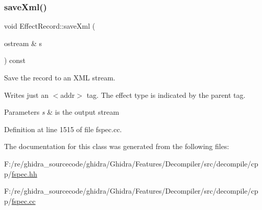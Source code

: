 \subsubsection{\texorpdfstring{saveXml()}{saveXml()}}
{\footnotesize\ttfamily void Effect\+Record\+::save\+Xml (\begin{DoxyParamCaption}\item[{ostream \&}]{s }\end{DoxyParamCaption}) const}



Save the record to an X\+ML stream. 

Writes just an $<$addr$>$ tag. The effect type is indicated by the parent tag. 
\begin{DoxyParams}{Parameters}
{\em s} & is the output stream \\
\hline
\end{DoxyParams}


Definition at line 1515 of file fspec.\+cc.



The documentation for this class was generated from the following files\+:\begin{DoxyCompactItemize}
\item 
F\+:/re/ghidra\+\_\+sourcecode/ghidra/\+Ghidra/\+Features/\+Decompiler/src/decompile/cpp/\mbox{\hyperlink{fspec_8hh}{fspec.\+hh}}\item 
F\+:/re/ghidra\+\_\+sourcecode/ghidra/\+Ghidra/\+Features/\+Decompiler/src/decompile/cpp/\mbox{\hyperlink{fspec_8cc}{fspec.\+cc}}\end{DoxyCompactItemize}
